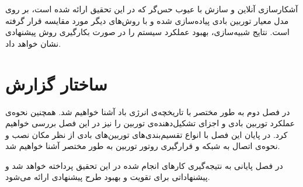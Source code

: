 آشکارسازی آنلاین  و سازش با عیوب حس‌گر که در این تحقیق ارائه شده است، بر روی مدل معیار توربین بادی پیاده‌سازی شده و با روش‌های دیگر مورد مقایسه قرار گرفته است. نتایج شبیه‌سازی، بهبود عملکرد سیستم را در صورت بکار‌گیری روش پیشنهادی نشان خواهد داد. 


\section{ساختار گزارش}
در فصل دوم  به طور مختصر با تاریخچه‌ی انرژی باد آشنا خواهیم شد. همچنین نحوه‌ی عملکرد توربین بادی و اجزای تشکیل‌دهنده‌ی توربین را نیز در این فصل بررسی خواهیم کرد. در پایان این فصل با انواع تقسیم‌بندی‌های توربین‌های بادی از نظر مکان نصب و نحوه‌ی اتصال به شبکه و قرار‌گیری روتور توربین به طور مختصر آشنا خواهیم شد.

در فصل پایانی به نتیجه‌گیری کار‌های انجام شده در این تحقیق پرداخته خواهد شد و پیشنهاداتی  برای تقویت و بهبود طرح پیشنهادی ارائه می‌شود. 


